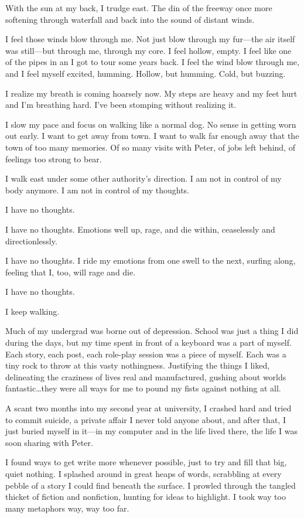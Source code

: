 With the sun at my back, I trudge east. The din of the freeway once more softening through waterfall and back into the sound of distant winds.

I feel those winds blow through me. Not just blow through my fur---the air itself was still---but through me, through my core. I feel hollow, empty. I feel like one of the pipes in an I got to tour some years back. I feel the wind blow through me, and I feel myself excited, humming. Hollow, but humming. Cold, but buzzing.

I realize my breath is coming hoarsely now. My steps are heavy and my feet hurt and I'm breathing hard. I've been stomping without realizing it.

I slow my pace and focus on walking like a normal dog. No sense in getting worn out early. I want to get away from town. I want to walk far enough away that the town of too many memories. Of so many visits with Peter, of jobs left behind, of feelings too strong to bear.

I walk east under some other authority's direction. I am not in control of my body anymore. I am not in control of my thoughts.

I have no thoughts.

I have no thoughts. Emotions well up, rage, and die within, ceaselessly and directionlessly.

I have no thoughts. I ride my emotions from one swell to the next, surfing along, feeling that I, too, will rage and die.

I have no thoughts.

I keep walking.

\secdiv{}

\noindent Much of my undergrad was borne out of depression. School was just a thing I did during the days, but my time spent in front of a keyboard was a part of myself. Each story, each post, each role-play session was a piece of myself. Each was a tiny rock to throw at this vasty nothingness. Justifying the things I liked, delineating the craziness of lives real and manufactured, gushing about worlds fantastic\ldots{}they were all ways for me to pound my fists against nothing at all.

A scant two months into my second year at university, I crashed hard and tried to commit suicide, a private affair I never told anyone about, and after that, I just buried myself in it---in my computer and in the life lived there, the life I was soon sharing with Peter.

I found ways to get write more whenever possible, just to try and fill that big, quiet nothing. I splashed around in great heaps of words, scrabbling at every pebble of a story I could find beneath the surface. I prowled through the tangled thicket of fiction and nonfiction, hunting for ideas to highlight. I took way too many metaphors way, way too far.

